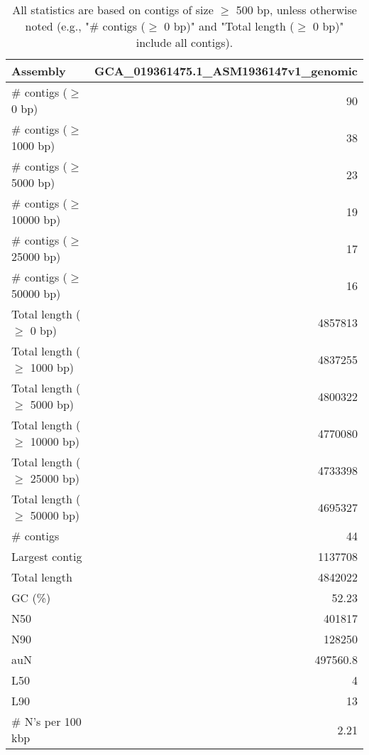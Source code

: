 \documentclass[12pt,a4paper]{article}
\begin{document}
\begin{table}[ht]
\begin{center}
\caption{All statistics are based on contigs of size $\geq$ 500 bp, unless otherwise noted (e.g., "\# contigs ($\geq$ 0 bp)" and "Total length ($\geq$ 0 bp)" include all contigs).}
\begin{tabular}{|l*{1}{|r}|}
\hline
Assembly & GCA\_019361475.1\_ASM1936147v1\_genomic \\ \hline
\# contigs ($\geq$ 0 bp) & 90 \\ \hline
\# contigs ($\geq$ 1000 bp) & 38 \\ \hline
\# contigs ($\geq$ 5000 bp) & 23 \\ \hline
\# contigs ($\geq$ 10000 bp) & 19 \\ \hline
\# contigs ($\geq$ 25000 bp) & 17 \\ \hline
\# contigs ($\geq$ 50000 bp) & 16 \\ \hline
Total length ($\geq$ 0 bp) & 4857813 \\ \hline
Total length ($\geq$ 1000 bp) & 4837255 \\ \hline
Total length ($\geq$ 5000 bp) & 4800322 \\ \hline
Total length ($\geq$ 10000 bp) & 4770080 \\ \hline
Total length ($\geq$ 25000 bp) & 4733398 \\ \hline
Total length ($\geq$ 50000 bp) & 4695327 \\ \hline
\# contigs & 44 \\ \hline
Largest contig & 1137708 \\ \hline
Total length & 4842022 \\ \hline
GC (\%) & 52.23 \\ \hline
N50 & 401817 \\ \hline
N90 & 128250 \\ \hline
auN & 497560.8 \\ \hline
L50 & 4 \\ \hline
L90 & 13 \\ \hline
\# N's per 100 kbp & 2.21 \\ \hline
\end{tabular}
\end{center}
\end{table}
\end{document}
